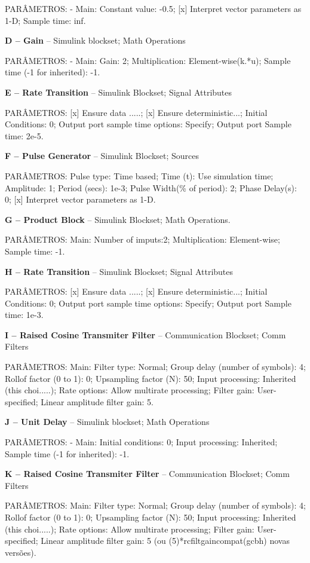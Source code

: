 PARÂMETROS: - Main: Constant value: -0.5; [x] Interpret vector parameters as 1-D; Sample time: inf.

\textbf{D – Gain} – Simulink blockset; Math Operations

PARÂMETROS: - Main: Gain: 2; Multiplication: Element-wise(k.*u); Sample time (-1 for inherited): -1.

\textbf{E – Rate Transition} – Simulink Blockset; Signal Attributes

PARÂMETROS: [x] Ensure data .....; [x] Ensure deterministic...; Initial Conditions: 0; Output port sample time options: Specify; Output port Sample time: 2e-5.

\textbf{F – Pulse Generator} – Simulink Blockset; Sources

PARÂMETROS: Pulse type: Time based; Time (t): Use simulation time; Amplitude: 1; Period (secs): 1e-3; Pulse Width(\% of period): 2; Phase Delay(s): 0; [x] Interpret vector parameters as 1-D. 

\textbf{G – Product Block} – Simulink Blockset; Math Operations.

PARÂMETROS: Main: Number of imputs:2; Multiplication: Element-wise; Sample time: -1.

\textbf{H – Rate Transition} – Simulink Blockset; Signal Attributes

PARÂMETROS: [x] Ensure data .....; [x] Ensure deterministic...; Initial Conditions: 0; Output port sample time options: Specify; Output port Sample time: 1e-3.

\textbf{I – Raised Cosine Transmiter Filter} – Communication Blockset; Comm Filters

PARÂMETROS: Main: Filter type: Normal; Group delay (number of symbols): 4; Rollof factor (0 to 1): 0; Upsampling factor (N): 50; Input processing: Inherited (this choi.....); Rate options: Allow multirate processing; Filter gain: User-specified; Linear amplitude filter gain: 5.

\textbf{J – Unit Delay} – Simulink blockset; Math Operations

PARÂMETROS: - Main: Initial conditions: 0; Input processing: Inherited; Sample time (-1 for inherited): -1.

\textbf{K – Raised Cosine Transmiter Filter} – Communication Blockset; Comm Filters

PARÂMETROS: Main: Filter type: Normal; Group delay (number of symbols): 4; Rollof factor (0 to 1): 0; Upsampling factor (N): 50; Input processing: Inherited (this choi.....); Rate options: Allow multirate processing; Filter gain: User-specified; Linear amplitude filter gain: 5 (ou (5)*rcfiltgaincompat(gcbh) novas versões).

